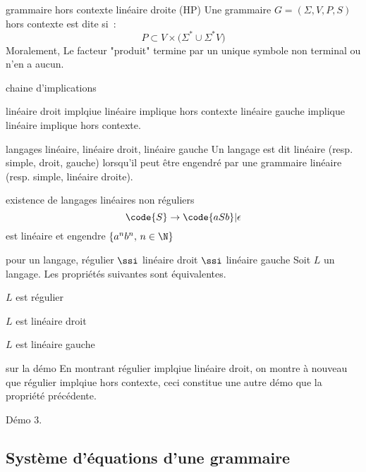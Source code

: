 \begin{adjustwidth}{-3cm}{-3cm}
\begin{definition}{}{grammaire hors contexte linéaire droite (HP)}
    Une grammaire $G = (\Sigma, V, P, S)$ hors contexte est dite  si~:
        $$P \subset V \times \big( \Sigma^* \cup \Sigma^*V \big)$$
    Moralement, Le facteur "produit" termine par un unique symbole non terminal ou n'en a aucun.
\end{definition}

\begin{remarque}{}{chaine d'implications}

    linéaire droit implqiue linéaire implique hors contexte
    linéaire gauche implique linéaire implique hors contexte.
    
\end{remarque}

\begin{definition}{}{langages linéaire, linéaire droit, linéaire gauche}
    Un langage est dit linéaire (resp. simple, droit, gauche) lorsqu'il peut être engendré par une grammaire linéaire (resp. simple, linéaire droite).
\end{definition}

\begin{remarque}{}{existence de langages linéaires non réguliers}
    $$\code{S} \rightarrow \code{aSb} \vert \epsilon$$ est linéaire et engendre $\{a^n b^n,\, n \in \N\}$
\end{remarque}

\begin{proposition}{}{pour un langage, régulier $\ssi$ linéaire droit $\ssi$ linéaire gauche} 
    Soit $L$ un langage. Les propriétés suivantes sont équivalentes.
    \begin{enumeratebf}
        \item $L$ est régulier
        \item $L$ est linéaire droit
        \item $L$ est linéaire gauche
    \end{enumeratebf}
\end{proposition}

\begin{remarque}{}{sur la démo}
    En montrant régulier implqiue linéaire droit, on montre à nouveau que régulier implqiue hors contexte, ceci constitue une autre démo que la propriété précédente.
\end{remarque}

Démo 3.

\subsection{Système d'équations d'une grammaire}


\end{adjustwidth}
